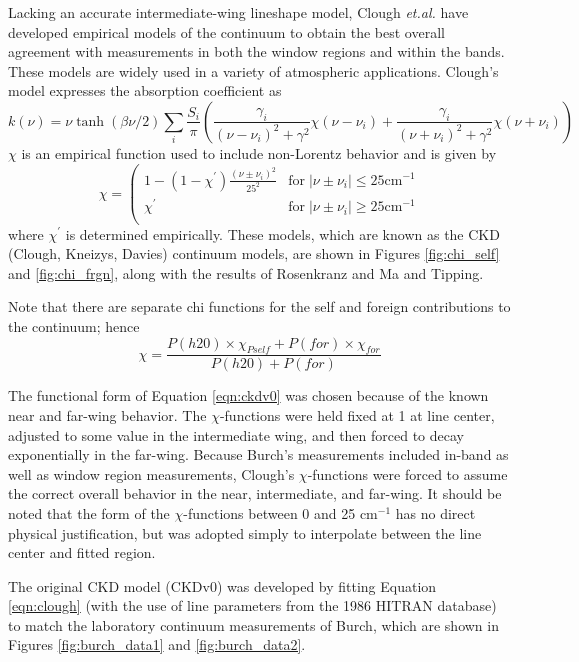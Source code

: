 \documentclass[11pt]{article}
\begin{document}
Lacking an accurate intermediate-wing lineshape model, 
Clough {\it et.al.}\cite{clo:89,clo:95}
have developed empirical models of the continuum to obtain the best overall
agreement with measurements in  both the window regions and within the
bands.  These models are widely used in a variety of atmospheric 
applications.  Clough's model expresses the absorption coefficient as
\begin{equation}
k(\nu)=\nu\tanh(\beta\nu/2)\sum_i\frac{S_i}{\pi}\left(
\frac{\gamma_i}{(\nu-\nu_i)^2 + \gamma^2}\chi(\nu-\nu_i) +
\frac{\gamma_i}{(\nu+\nu_i)^2 + \gamma^2}\chi(\nu+\nu_i)\right)
\label{eqn:clough}
\end{equation}
$\chi$ is an empirical function used to include non-Lorentz behavior and 
is given by
\begin{equation}
\chi=\left(\begin{array}{cc}
1-(1-\chi^\prime)\frac{(\nu\pm\nu_i)^{2}}{25^2} & 
\mbox{for} \; |\nu\pm\nu_i|\le 25 \mbox{cm}^{-1} \\
\chi^\prime & \mbox{for} \; |\nu\pm\nu_i|\ge 25 \mbox{cm}^{-1} \\
\end{array}\right.
\label{eqn:ckdv0}
\end{equation}
where $\chi^\prime$ is determined empirically.  These models, which are
known as the CKD (Clough, Kneizys, Davies) continuum models, are shown in 
Figures \ref{fig:chi_self} and \ref{fig:chi_frgn}, along with the results
of Rosenkranz and Ma and Tipping.  

Note that there are separate chi functions for the self and foreign 
contributions to the continuum; hence 
\[
\chi = \frac{P(h20) \times \chi_{Pself} + P(for) \times \chi_{for}}
            {P(h20) + P(for)}
\]

The functional form of Equation \ref{eqn:ckdv0} was chosen because of the
known near and far-wing behavior.  The $\chi$-functions were held
fixed at 1 at line center, adjusted to some value in the intermediate wing, 
and then forced to decay exponentially in the far-wing.
Because Burch's measurements included in-band as well as window
region measurements,  Clough's $\chi$-functions were forced to assume the
correct overall behavior in the near, intermediate, and far-wing.  
It should be noted that the form of the $\chi$-functions between 0 and 25
cm$^{-1}$ has no direct physical justification, but was adopted simply to
interpolate between the line center and fitted region.

The original CKD model (CKDv0) was developed by fitting
Equation \ref{eqn:clough} (with the use of line parameters from the 1986
HITRAN database) to match the laboratory continuum measurements of Burch,
which are shown in Figures \ref{fig:burch_data1} and \ref{fig:burch_data2}.
\end{document}
